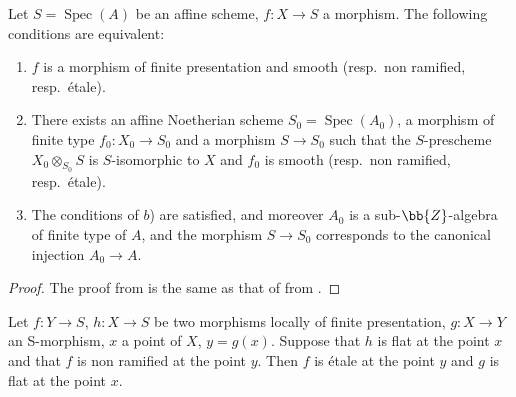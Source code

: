 \begin{corollary}[17.7.9]
\label{IV.17.7.9}
Let $S=\operatorname{Spec}(A)$ be an affine scheme, $f:X\to S$ a morphism.
The following conditions are equivalent:
\begin{enumerate}
  \item[a)] $f$ is a morphism of finite presentation and smooth (resp.\ non ramified, resp.\ \'etale).
  \item[b)] There exists an affine Noetherian scheme $S_0=\operatorname{Spec}(A_0)$, a morphism of finite type $f_0:X_0\to S_0$ and a morphism $S\to S_0$ such that the $S$-prescheme $X_0\otimes_{S_0} S$ is $S$-isomorphic to $X$ and $f_0$ is smooth (resp.\ non ramified, resp.\ \'etale).
  \item[c)] The conditions of $b$) are satisfied, and moreover $A_0$ is a sub-$\bb{Z}$-algebra of finite type of $A$, and the morphism $S\to S_0$ corresponds to the canonical injection $A_0\to A$.
\end{enumerate}
\end{corollary}

\begin{proof}
The proof from  is the same as that of  from .
\end{proof}

\begin{proposition}[17.7.10]
\label{IV.17.7.10}
Let $f:Y\to S$, $h:X\to S$ be two morphisms locally of finite presentation, $g:X\to Y$ an S-morphism, $x$ a point of $X$, $y=g(x)$.
Suppose that $h$ is flat at the point $x$ and that $f$ is non ramified at the point $y$.
Then $f$ is \'etale at the point $y$ and $g$ is flat at the point $x$.
\end{proposition}

